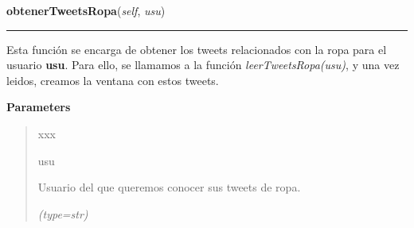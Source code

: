 \hspace{.8\funcindent}\begin{boxedminipage}{\funcwidth}

    \raggedright \textbf{obtenerTweetsRopa}(\textit{self}, \textit{usu})

    \vspace{-1.5ex}

    \rule{\textwidth}{0.5\fboxrule}
\setlength{\parskip}{2ex}
    Esta función se encarga de obtener los tweets relacionados con la ropa 
    para el usuario \textbf{usu}. Para ello, se llamamos a la función 
    \textit{leerTweetsRopa(usu)}, y una vez leidos, creamos la ventana con 
    estos tweets.

\setlength{\parskip}{1ex}
      \textbf{Parameters}
      \vspace{-1ex}

      \begin{quote}
        \begin{Ventry}{xxx}

          \item[usu]

          Usuario del que queremos conocer sus tweets de ropa.

            {\it (type=str)}

        \end{Ventry}

      \end{quote}

    \end{boxedminipage}

    \label{funcionesTwitter:FuncionesTwitter:leerTweetsRopa}

    \vspace{0.5ex}

